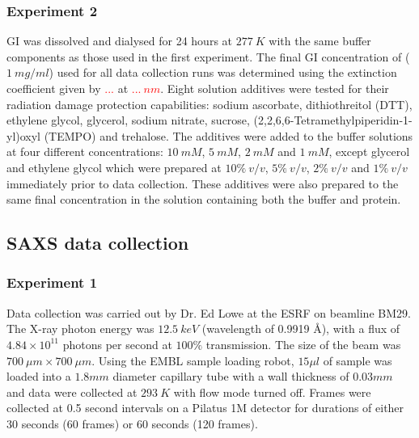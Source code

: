 \subsubsection{Experiment 2}
\label{subs:Experiment 2 - sample prep}
GI was dissolved and dialysed for 24 hours at $277\ K$ with the same buffer components as those used in the first experiment.
The final GI concentration of ($1\ mg/ml$) used for all data collection runs was determined using the extinction coefficient given by \textcolor{red}{...} at \textcolor{red}{$...\ nm$}.
Eight solution additives were tested for their radiation damage protection capabilities: sodium ascorbate, dithiothreitol (DTT), ethylene glycol, glycerol, sodium nitrate, sucrose, (2,2,6,6-Tetramethylpiperidin-1-yl)oxyl (TEMPO) and trehalose.
The additives were added to the buffer solutions at four different concentrations: $10\ mM$, $5\ mM$, $2\ mM$ and $1\ mM$, except glycerol and ethylene glycol which were prepared at $10\%\ v/v$, $5\%\ v/v$, $2\%\ v/v$ and $1\%\ v/v$ immediately prior to data collection.
These additives were also prepared to the same final concentration in the solution containing both the buffer and protein.

\subsection{SAXS data collection}
\label{sub:SAXS data collection}

\subsubsection{Experiment 1}
\label{subs:Experiment 1- data col}
Data collection was carried out by Dr. Ed Lowe at the ESRF on beamline BM29.
The X-ray photon energy was $12.5\ keV$ (wavelength of 0.9919 \AA), with a flux of $4.84 \times 10^{11}$ photons per second at $100\%$ transmission.
The size of the beam was $700\ \mu m \times 700\ \mu m$.
Using the EMBL sample loading robot, $15 \mu l$ of sample was loaded into a $1.8 mm$ diameter capillary tube with a wall thickness of $0.03 mm$ and data were collected at $293\ K$ with flow mode turned off.
Frames were collected at 0.5 second intervals on a Pilatus 1M detector for durations of either 30 seconds (60 frames) or 60 seconds (120  frames).

